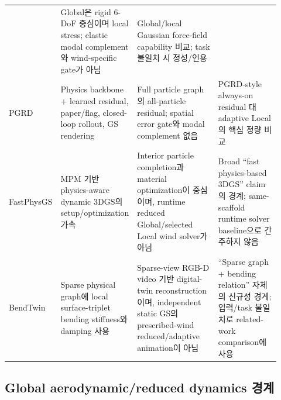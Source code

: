 \documentclass[11pt,a4paper]{article}
\begin{document}
\begin{longtable}{L{0.16\linewidth}L{0.23\linewidth}L{0.30\linewidth}L{0.23\linewidth}}
& Global은 rigid 6-DoF 중심이며 local stress; elastic modal complement와 wind-specific gate가 아님
& Global/local Gaussian force-field capability 비교; task 불일치 시 정성/인용 \\
\addlinespace
PGRD \cite{patel2026pgrd}
& Physics backbone + learned residual, paper/flag, closed-loop rollout, GS rendering
& Full particle graph의 all-particle residual; spatial error gate와 modal complement 없음
& PGRD-style always-on residual 대 adaptive Local의 핵심 정량 비교 \\
\addlinespace
FastPhysGS \cite{ma2026fastphysgs}
& MPM 기반 physics-aware dynamic 3DGS의 setup/optimization 가속
& Interior particle completion과 material optimization이 중심이며,
runtime reduced Global/selected Local wind solver가 아님
& Broad ``fast physics-based 3DGS'' claim의 경계;
same-scaffold runtime solver baseline으로 간주하지 않음 \\
\addlinespace
BendTwin \cite{jing2026bendtwin}
& Sparse physical graph에 local surface-triplet bending stiffness와 damping 사용
& Sparse-view RGB-D video 기반 digital-twin reconstruction이며,
independent static GS의 prescribed-wind reduced/adaptive animation이 아님
& ``Sparse graph + bending relation'' 자체의 신규성 경계;
입력/task 불일치로 related-work comparison에 사용 \\
\bottomrule
\end{longtable}

\subsection{Global aerodynamic/reduced dynamics 경계}
\end{document}
